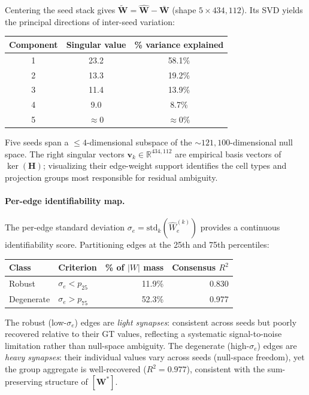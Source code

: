 \documentclass[11pt,a4paper]{article}
\begin{document}
Centering the seed stack gives $\tilde{\mathbf{W}} = \hat{\mathbf{W}} -
\bar{\mathbf{W}}$ (shape $5\times 434{,}112$).  Its SVD yields the principal
directions of inter-seed variation:
\begin{center}
\begin{tabular}{ccc}
\toprule
Component & Singular value & \% variance explained \\
\midrule
1 & 23.2 & 58.1\% \\
2 & 13.3 & 19.2\% \\
3 & 11.4 & 13.9\% \\
4 &  9.0 &  8.7\% \\
5 & $\approx 0$ & $\approx 0\%$ \\
\bottomrule
\end{tabular}
\end{center}
Five seeds span a $\leq 4$-dimensional subspace of the
$\sim 121{,}100$-dimensional null space.  The right singular vectors
$\mathbf{v}_k \in \mathbb{R}^{434{,}112}$ are empirical basis vectors of
$\ker(\mathbf{H})$; visualizing their edge-weight support identifies the cell
types and projection groups most responsible for residual ambiguity.

\paragraph{Per-edge identifiability map.}

The per-edge standard deviation $\sigma_e = \mathrm{std}_k(\hat{W}_e^{(k)})$
provides a continuous identifiability score.  Partitioning edges at the
25th and 75th percentiles:
\begin{center}
\begin{tabular}{llrr}
\toprule
Class & Criterion & \% of $|W|$ mass & Consensus $R^2$ \\
\midrule
Robust   & $\sigma_e < p_{25}$ & 11.9\% & 0.830 \\
Degenerate & $\sigma_e > p_{75}$ & 52.3\% & 0.977 \\
\bottomrule
\end{tabular}
\end{center}
The robust (low-$\sigma_e$) edges are \emph{light synapses}: consistent across
seeds but poorly recovered relative to their GT values, reflecting a systematic
signal-to-noise limitation rather than null-space ambiguity.  The degenerate
(high-$\sigma_e$) edges are \emph{heavy synapses}: their individual values vary
across seeds (null-space freedom), yet the group aggregate is well-recovered
($R^2 = 0.977$), consistent with the sum-preserving structure of $[\mathbf{W}^*]$.
\end{document}
